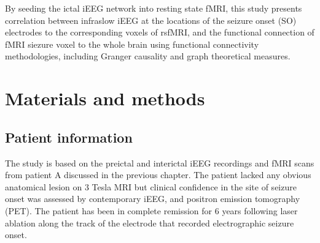 


By seeding the ictal iEEG network into resting state fMRI, this study presents correlation between infraslow iEEG at the locations of the seizure onset (SO) electrodes to the corresponding voxels of rsfMRI, and the functional connection of fMRI siezure voxel to the whole brain using functional connectivity methodologies, including Granger causality and graph theoretical measures. 




\section{Materials and methods}
\label{sec:methods}

\subsection{Patient information}
The study is based on the preictal and interictal iEEG recordings and fMRI scans from patient A discussed in the previous chapter. The patient lacked any obvious anatomical lesion on 3 Tesla MRI but clinical confidence in the site of seizure onset was assessed by contemporary iEEG, and positron emission tomography (PET). The patient has been in complete remission for 6 years following laser ablation along the track of the electrode that recorded electrographic seizure onset.

